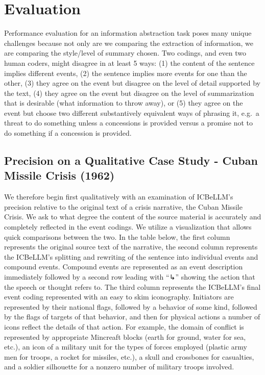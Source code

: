 \documentclass[
]{article}
\begin{document}
\section{Evaluation}\label{evaluation}

Performance evaluation for an information abstraction task poses many
unique challenges because not only are we comparing the extraction of
information, we are comparing the style/level of summary chosen. Two
codings, and even two human coders, might disagree in at least 5 ways:
(1) the content of the sentence implies different events, (2) the
sentence implies more events for one than the other, (3) they agree on
the event but disagree on the level of detail supported by the text, (4)
they agree on the event but disagree on the level of summarization that
is desirable (what information to throw away), or (5) they agree on the
event but choose two different substantively equivalent ways of phrasing
it, e.g.~a threat to do something unless a concessions is provided
versus a promise not to do something if a concession is provided.

\subsection{Precision on a Qualitative Case Study - Cuban Missile Crisis
(1962)}\label{precision-on-a-qualitative-case-study---cuban-missile-crisis-1962}

We therefore begin first qualitatively with an examination of ICBeLLM's
precision relative to the original text of a crisis narrative, the Cuban
Missile Crisis. We ask to what degree the content of the source material
is accurately and completely reflected in the event codings. We utilize
a visualization that allows quick comparisons between the two. In the
table below, the first column represents the original source text of the
narrative, the second column represents the ICBeLLM's splitting and
rewriting of the sentence into individual events and compound events.
Compound events are represented as an event description immediately
followed by a second row leading with ``↳'' showing the action that the
speech or thought refers to. The third column represents the ICBeLLM's
final event coding represented with an easy to skim iconography.
Initiators are represented by their national flags, followed by a
behavior of some kind, followed by the flags of targets of that
behavior, and then for physical actions a number of icons reflect the
details of that action. For example, the domain of conflict is
represented by appropriate Mincreaft blocks (earth for ground, water for
sea, etc.), an icon of a military unit for the types of forces employed
(plastic army men for troops, a rocket for missiles, etc.), a skull and
crossbones for casualties, and a soldier silhouette for a nonzero number
of military troops involved.
\end{document}
